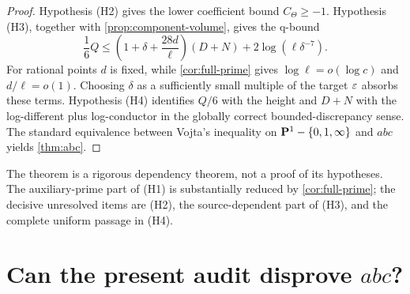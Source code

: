 \begin{proof}
Hypothesis (H2) gives the lower coefficient bound $C_\Theta\ge-1$.  Hypothesis (H3), together with \cref{prop:component-volume}, gives the q-bound
\[
 \frac16Q\le
 \left(1+\delta+\frac{28d}{\ell}\right)(D+N)
 +2\log(\ell\delta^{-7}).
\]
For rational points $d$ is fixed, while \cref{cor:full-prime} gives $\log\ell=o(\log c)$ and $d/\ell=o(1)$.  Choosing $\delta$ as a sufficiently small multiple of the target $\varepsilon$ absorbs these terms.  Hypothesis (H4) identifies $Q/6$ with the height and $D+N$ with the log-different plus log-conductor in the globally correct bounded-discrepancy sense.  The standard equivalence between Vojta's inequality on $\mathbf P^1-\{0,1,\infty\}$ and $abc$ yields \cref{thm:abc}.
\end{proof}

\begin{remark}
The theorem is a rigorous dependency theorem, not a proof of its hypotheses.  The auxiliary-prime part of (H1) is substantially reduced by \cref{cor:full-prime}; the decisive unresolved items are (H2), the source-dependent part of (H3), and the complete uniform passage in (H4).
\end{remark}

\section{Can the present audit disprove $abc$?}
